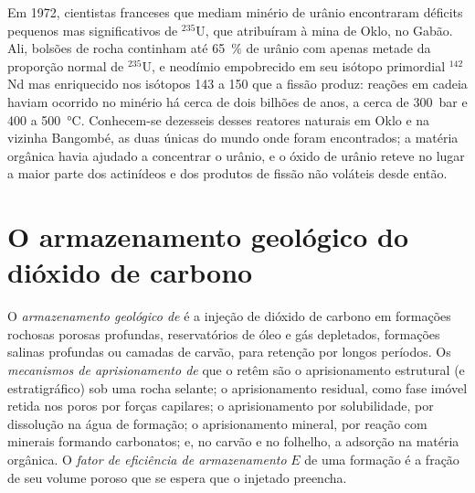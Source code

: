 \begin{history}
Em 1972, cientistas franceses que mediam minério de urânio encontraram déficits pequenos mas significativos de
$^{235}$U, que atribuíram à mina de Oklo, no Gabão. Ali, bolsões de rocha continham até
\qty{65}{\percent} de urânio com apenas metade da proporção normal de $^{235}$U, e neodímio
empobrecido em seu isótopo primordial $^{142}$Nd mas enriquecido nos isótopos 143 a 150 que a fissão
produz: reações em cadeia haviam ocorrido no minério há cerca de dois bilhões de anos, a cerca de \qty{300}{bar}
e 400 a \qty{500}{\celsius}. Conhecem-se dezesseis desses reatores naturais em Oklo e na vizinha
Bangombé, as duas únicas  do mundo onde foram encontrados; a matéria orgânica havia ajudado a
concentrar o urânio, e o óxido de urânio reteve no lugar a maior parte dos actinídeos e dos
produtos de fissão não voláteis desde então.
\end{history}

\section{O armazenamento geológico do dióxido de carbono}\label{sec:b2:energy-geology:ccs}

\begin{definition}\label{def:b2:energy-geology:ccs}
O \emph{armazenamento geológico de } é a injeção de dióxido
de carbono em formações rochosas porosas profundas, reservatórios de óleo e gás depletados, formações salinas
profundas ou camadas de carvão, para retenção por longos períodos. Os \emph{mecanismos de aprisionamento
de } que o retêm são o aprisionamento estrutural (e estratigráfico)
sob uma rocha selante; o aprisionamento residual, como fase imóvel retida nos poros por forças
capilares; o aprisionamento por solubilidade, por dissolução na água de formação; o aprisionamento mineral, por reação
com minerais formando carbonatos; e, no carvão e no folhelho, a adsorção na matéria orgânica. O \emph{fator de eficiência de armazenamento}
$E$ de uma formação é a fração de seu volume poroso que se espera que o
 injetado preencha.
\end{definition}

